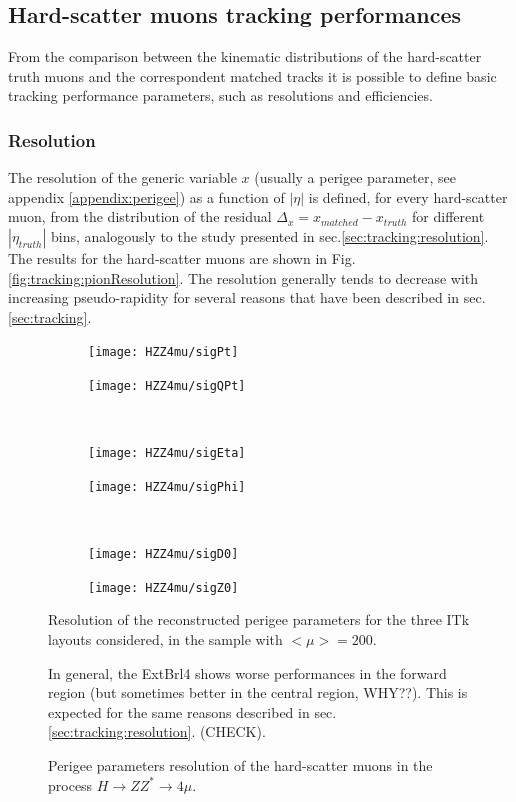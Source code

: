 \documentclass[a4paper,twoside,12pt]{article}
\begin{document}
\subsection{Hard-scatter muons tracking performances}
From the comparison between the kinematic distributions of the hard-scatter truth muons and the correspondent matched 
tracks it is possible to define basic tracking performance parameters, such as resolutions and efficiencies. \\

\subsubsection*{Resolution}
The resolution of the generic variable $x$ (usually a perigee parameter, see appendix \ref{appendix:perigee}) as a function of $|\eta|$ is defined, for every hard-scatter muon, from the distribution of the residual 
$\Delta_x = x_{matched} - x_{truth}$ for different $|\eta_{truth}|$ bins, analogously to the study presented in sec.\ref{sec:tracking:resolution}. 
The results for the hard-scatter muons are shown in Fig.\ref{fig:tracking:pionResolution}.
The resolution generally tends to decrease 
with increasing pseudo-rapidity for several reasons that have been described in sec.\ref{sec:tracking}.

\begin{figure}
\begin{subfigure}{.5\linewidth}
\texttt{[image: HZZ4mu/sigPt]}
\caption{}
\label{fig:HZZ4mu:sigPt}
\end{subfigure}
\begin{subfigure}{.5\linewidth}
\texttt{[image: HZZ4mu/sigQPt]}
\caption{}
\label{fig:HZZ4mu:sigQPt}
\end{subfigure}\\[1ex]
\begin{subfigure}{.5\linewidth}
\texttt{[image: HZZ4mu/sigEta]}
\caption{}
\label{fig:HZZ4mu:sigEta}
\end{subfigure}
\begin{subfigure}{.5\linewidth}
\texttt{[image: HZZ4mu/sigPhi]}
\caption{}
\label{fig:HZZ4mu:sigPhi}
\end{subfigure}\\[1ex]
\begin{subfigure}{.5\linewidth}
\texttt{[image: HZZ4mu/sigD0]}
\caption{}
\label{fig:HZZ4mu:sigD0}
\end{subfigure}
\begin{subfigure}{.5\linewidth}
\texttt{[image: HZZ4mu/sigZ0]}
\caption{}
\label{fig:HZZ4mu:sigZ0}
\end{subfigure}
\label{fig:HZZ4mu:muonResolution}
\caption{Resolution of the reconstructed perigee parameters for the three ITk layouts considered, in the sample with $<\mu> = 200$.}

In general, the ExtBrl4 shows worse performances in the forward region (but sometimes better in the central region, WHY??). This is expected for the same reasons described in sec.\ref{sec:tracking:resolution}. (CHECK).


\caption{Perigee parameters resolution of the hard-scatter muons in the process $H \rightarrow ZZ^* \rightarrow 4\mu$.}
\end{figure}
\end{document}
